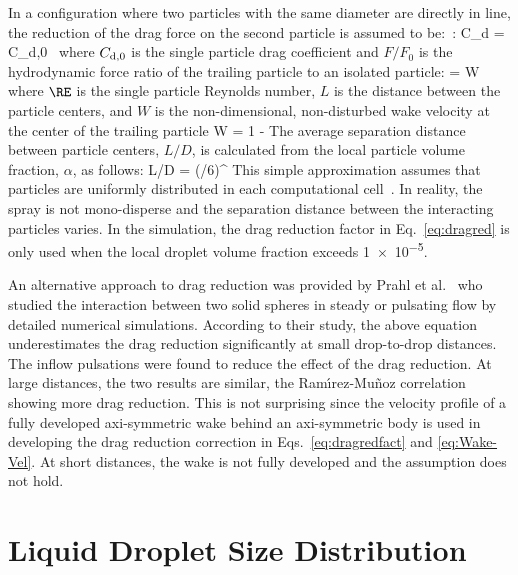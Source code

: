 In a configuration where two particles with the same diameter are directly in line, the reduction of the drag force on the second particle is assumed to be:~\cite{Ramirez:1}:
\be
  C_{\rm d} = C_{\rm d,0} \,  \label{eq:dragred}
\ee
where $C_{\rm d,0}$ is the single particle drag coefficient and $F / F_0$ is the hydrodynamic force ratio of the trailing particle to an isolated particle:
\be
   = W  \label{eq:dragredfact}
\ee
where $\RE$ is the single particle Reynolds number, $L$ is the distance between the particle centers, and $W$ is the non-dimensional, non-disturbed wake velocity at the center of the trailing particle
\be
  W = 1 -   \label{eq:Wake-Vel}
\ee
The average separation distance between particle centers, $L/D$, is calculated from the local particle volume fraction, $\alpha$, as follows:
\be
  L/D = \left(\pi/6\alpha \right)^{}
\ee
This simple approximation assumes that particles are uniformly distributed in each computational cell~\cite{Bhattacharyya2008}. In reality, the spray is not mono-disperse and the separation distance between the interacting particles varies. In the simulation, the drag reduction factor in Eq.~\ref{eq:dragred} is only used when the local droplet volume fraction exceeds \num{1e-5}.

An alternative approach to drag reduction was provided by Prahl et al.~\cite{Prahl:1} who studied the interaction between two solid spheres in steady or pulsating flow by detailed numerical simulations. According to their study, the above equation underestimates the drag reduction significantly at small drop-to-drop distances. The inflow pulsations were found to reduce the effect of the drag reduction. At large distances, the two results are similar, the Ram\'{\i}rez-Mu\~{n}oz correlation showing more drag reduction. This is not surprising since the velocity profile of a fully developed axi-symmetric wake behind an axi-symmetric body is used in developing the drag reduction correction in Eqs.~\ref{eq:dragredfact} and \ref{eq:Wake-Vel}. At short distances, the wake is not fully developed and the assumption does not hold.

\section{Liquid Droplet Size Distribution}

